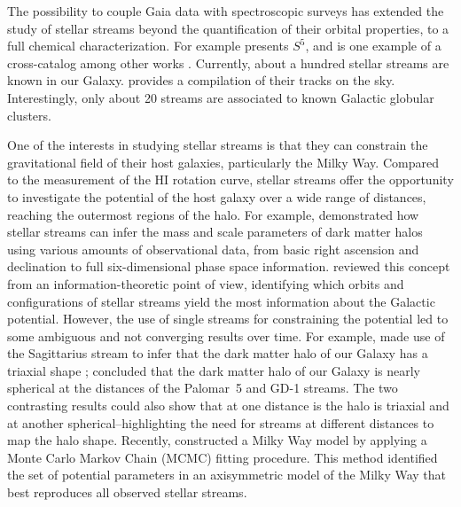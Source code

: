 \documentclass{aa}
\begin{document}
  The possibility to couple Gaia data with spectroscopic surveys has extended the study of stellar streams beyond the quantification of their orbital properties, to a full chemical characterization. For example \citet{2019MNRAS.490.3508L} presents $S^5$, and is one example of a cross-catalog among other works \citep{2020AJ....160..181J, 2021ApJ...911..149L, 2022ApJ...928...30L, 2024MNRAS.529.2413U}. Currently, about a hundred stellar streams are known in our Galaxy. \citet{2023MNRAS.520.5225M} provides a compilation of their tracks on the sky. Interestingly, only about 20 streams are associated to known Galactic globular clusters.

  One of the interests in studying stellar streams is that they can constrain the gravitational field of their host galaxies, particularly the Milky Way. Compared to the measurement of the HI rotation curve, stellar streams offer the opportunity to investigate the potential of the host galaxy over a wide range of distances, reaching the outermost regions of the halo. For example, \citet{2011MNRAS.417..198V} demonstrated how stellar streams can infer the mass and scale parameters of dark matter halos using various amounts of observational data, from basic right ascension and declination to full six-dimensional phase space information. \citet{2018ApJ...867..101B} reviewed this concept from an information-theoretic point of view, identifying which orbits and configurations of stellar streams yield the most information about the Galactic potential. However, the use of single streams for constraining the potential led to some ambiguous and not converging results over time. For example, \citet{2010ApJ...718.1128L} made use of the Sagittarius stream to infer that the dark matter halo of our Galaxy has a triaxial shape \citep[but see also][]{2004MNRAS.351..643H, 2005ApJ...619..800J, 2005ApJ...619..807L}; \citet{2016ApJ...833...31B} concluded that the dark matter halo of our Galaxy is nearly spherical at the distances of the Palomar~5 and GD-1 streams. The two contrasting results could also show that at one distance is the halo is triaxial and at another spherical--highlighting the need for streams at different distances to map the halo shape. Recently, \citet{2024ApJ...967...89I} constructed a Milky Way model by applying a Monte Carlo Markov Chain (MCMC) fitting procedure. This method identified the set of potential parameters in an axisymmetric model of the Milky Way that best reproduces all observed stellar streams.
\end{document}
